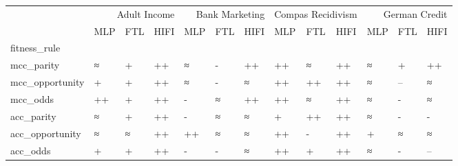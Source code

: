 \begin{tabular}{lllllllllllll}
\toprule
 & \multicolumn{3}{r}{Adult Income} & \multicolumn{3}{r}{Bank Marketing} & \multicolumn{3}{r}{Compas Recidivism} & \multicolumn{3}{r}{German Credit} \\
 & MLP & FTL & HIFI & MLP & FTL & HIFI & MLP & FTL & HIFI & MLP & FTL & HIFI \\
fitness_rule &  &  &  &  &  &  &  &  &  &  &  &  \\
\midrule
mcc_parity & ≈ & + & ++ & ≈ & - & ++ & ++ & ≈ & ++ & ≈ & + & ++ \\
mcc_opportunity & + & + & ++ & ≈ & - & ≈ & ++ & ++ & ++ & ≈ & -- & ≈ \\
mcc_odds & ++ & + & ++ & - & ≈ & ++ & ++ & ≈ & ++ & ≈ & - & ≈ \\
acc_parity & ≈ & + & ++ & - & ≈ & ≈ & + & ++ & ++ & ≈ & - & - \\
acc_opportunity & ≈ & ≈ & ++ & ++ & ≈ & ≈ & ++ & - & ++ & + & ≈ & ≈ \\
acc_odds & + & + & ++ & - & - & ≈ & ++ & + & ++ & ≈ & - & -- \\
\bottomrule
\end{tabular}
